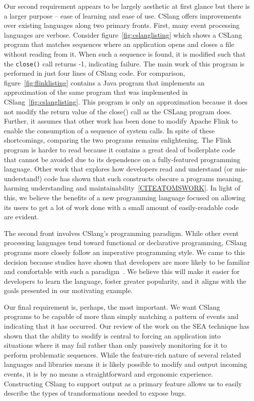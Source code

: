 Our second requirement appears to be largely aesthetic at first glance
but there is a
larger purpose -- ease of learning and ease of use.  CSlang offers
improvements over existing languages along two primary fronts.
First, many event processing languages are verbose.
Consider figure~\ref{fig:cslanglisting}  which shows a
CSLang program that matches sequences where an application opens and closes
a file without reading from it.  When such a sequence is found, it is
modified such that the {\tt close()} call returns -1, indicating failure.
The main work of this program is performed in just four lines of CSlang
code.  For comparison, figure~\ref{fig:flinklisting} contains a Java program that
implements an approximation of the same program that was implemented in
CSlang~\ref{fig:cslanglisting}.
This program is only an approximation because it does not modify the return
value of the close() call as the CSLang program does.  Further, it assumes
that other work has been done to modify Apache Flink to enable the
consumption of a sequence of system calls.
In spite of these shortcomings, comparing the two programs remains
enlightening.  The Flink program is harder to read because it contains a
great deal of boilerplate code
that cannot be avoided due to its dependence on a fully-featured
programming language.  Other work that explores how developers read and
understand (or mis-understand!) code has shown that such constructs obscure
a programs meaning, harming understanding and
maintainability~\ref{CITEATOMSWORK}.
In light of this, we believe the benefits of a
new programming language
focused on allowing its users to get a lot of work done
with a small amount of easily-readable code are evident.

The second front involves CSlang's programming paradigm.
While other event processing languages tend toward functional or
declarative programming,
CSlang programs more closely follow an imperative programming style.
We came to this decision because studies
have shown that developers are more likely to be familiar and comfortable
with such a paradigm~\cite{XXXX}.  We believe this will make it easier for
developers to learn the language, foster greater popularity, and it aligns
with the goals presented in our motivating example.

Our final requirement is, perhaps, the most important.
We want CSlang programs to be capable of more than simply matching
a pattern of events and indicating that it has occurred.
Our review of the work on the SEA technique has shown that the ability to
{\textit modify} is central to forcing an application into situations where
it may fail rather than only passively monitoring for it to perform
problematic sequences.  While the feature-rich nature of several related
languages and libraries means it is likely possible to modify and output
incoming events, it is by no means a straightforward
and ergonomic experience.
Constructing CSlang to support output as a primary feature allows us to
easily describe the types of transformations needed to expose bugs.


